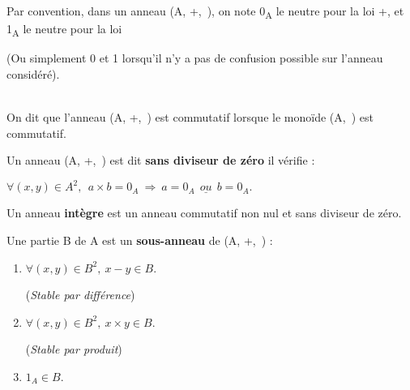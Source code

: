 \vspace{0.2cm}

\noindent Par convention, dans un anneau (A, +,\ \x), on note 0\textsubscript{A} le neutre pour la loi +, et 1\textsubscript{A} le neutre pour la loi \x
\begin{small}
    (Ou simplement 0 et 1 lorsqu'il n'y a pas de confusion possible sur l'anneau considéré).
\end{small} \\
On dit que l'anneau (A, +,\ \x) est commutatif lorsque le monoïde (A,\ \x) est commutatif.

\vspace{1cm}

\noindent Un anneau (A, +,\ \x) est dit \textbf{sans diviseur de zéro} \ssi il vérifie : \vspace{-0.2cm}
\begin{center}
    \( \forall(x,y)\in A^2,\ \ a\times b=0_A \ \Rightarrow \ a=0_A\ \ \underline{ou}\ \ b=0_A. \)
\end{center}\vspace{0.2cm}
Un anneau \textbf{intègre} est un anneau commutatif non nul et sans diviseur de zéro.

\vspace{1.2cm}

\noindent Une partie B de A est un \textbf{sous-anneau} de (A, +,\ \x) \ssi :\vspace{-0.1cm}
\begin{enumerate}[leftmargin=2cm]
    \item \(\forall(x,y)\in B^2,\ x-y\in B \). \
    \begin{small}
        (\emph{Stable par différence})
    \end{small}\vspace{0.1cm}

    \item \(\forall(x,y)\in B^2,\ x\times y\in B \). \
    \begin{small}
        (\emph{Stable par produit})
    \end{small}\vspace{0.1cm}

    \item \(1_A\in B.\)
\end{enumerate}
\vspace{1cm}


